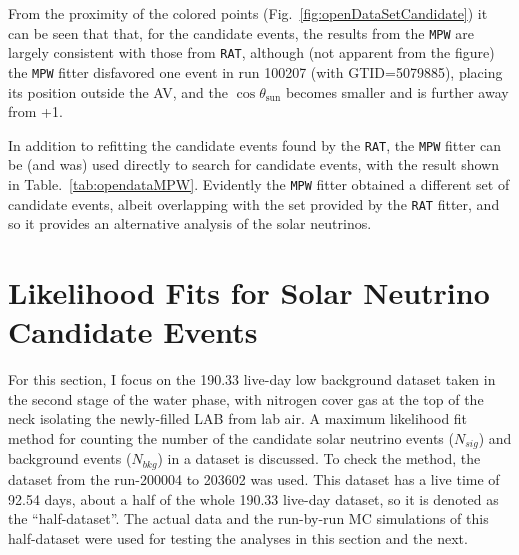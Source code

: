 From the proximity of the colored points (Fig.~\ref{fig:openDataSetCandidate}) it can be seen that that, for the candidate events, the results from the \texttt{MPW} are largely consistent with those from \texttt{RAT}, although (not apparent from the figure) the \texttt{MPW} fitter disfavored one event in run 100207 (with GTID=5079885), placing its position outside the AV, and the $\cos\theta_\mathrm{sun}$ becomes smaller and is further away from +1. %

In addition to refitting the candidate events found by the \texttt{RAT}, the \texttt{MPW} fitter can be (and was) used directly to search for candidate events, with the result shown in Table.~\ref{tab:opendataMPW}. Evidently the \texttt{MPW} fitter obtained a different set of candidate events, albeit overlapping with the set provided by the \texttt{RAT} fitter, and so it provides an alternative analysis of the solar neutrinos.

\section{Likelihood Fits for Solar Neutrino Candidate Events}

For this section, I focus on the 190.33 live-day low background dataset taken in the second stage of the water phase, with nitrogen cover gas at the top of the neck isolating the newly-filled LAB from lab air. A maximum likelihood fit method for counting the number of the candidate solar neutrino events ($N_{sig}$) and background events ($N_{bkg}$) in a dataset is discussed. To check the method, the dataset from the run-200004 to 203602 was used. This dataset has a live time of 92.54 days, about a half of the whole 190.33 live-day dataset, so it is denoted as the ``half-dataset''. The actual data and the run-by-run MC simulations of this half-dataset were used for testing the analyses in this section and the next.

